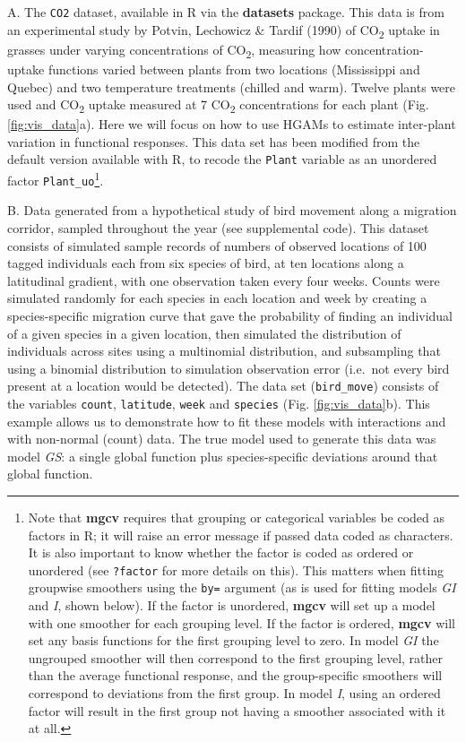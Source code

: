 \documentclass[12pt]{article}
\let\rmarkdownfootnote\footnote%
\def\footnote{\protect\rmarkdownfootnote}
\begin{document}
A. The \texttt{CO2} dataset, available in R via the \textbf{datasets}
package. This data is from an experimental study by Potvin, Lechowicz \&
Tardif (1990) of CO\textsubscript{2} uptake in grasses under varying
concentrations of CO\textsubscript{2}, measuring how
concentration-uptake functions varied between plants from two locations
(Mississippi and Quebec) and two temperature treatments (chilled and
warm). Twelve plants were used and CO\textsubscript{2} uptake measured
at 7 CO\textsubscript{2} concentrations for each plant (Fig.
\ref{fig:vis_data}a). Here we will focus on how to use HGAMs to estimate
inter-plant variation in functional responses. This data set has been
modified from the default version available with R, to recode the
\texttt{Plant} variable as an unordered factor
\texttt{Plant\_uo}\footnote{Note that \textbf{mgcv} requires that
  grouping or categorical variables be coded as factors in R; it will
  raise an error message if passed data coded as characters. It is also
  important to know whether the factor is coded as ordered or unordered
  (see \texttt{?factor} for more details on this). This matters when
  fitting groupwise smoothers using the \texttt{by=} argument (as is
  used for fitting models \emph{GI} and \emph{I}, shown below). If the
  factor is unordered, \textbf{mgcv} will set up a model with one
  smoother for each grouping level. If the factor is ordered,
  \textbf{mgcv} will set any basis functions for the first grouping
  level to zero. In model \emph{GI} the ungrouped smoother will then
  correspond to the first grouping level, rather than the average
  functional response, and the group-specific smoothers will correspond
  to deviations from the first group. In model \emph{I}, using an
  ordered factor will result in the first group not having a smoother
  associated with it at all.}.

B. Data generated from a hypothetical study of bird movement along a
migration corridor, sampled throughout the year (see supplemental code).
This dataset consists of simulated sample records of numbers of observed
locations of 100 tagged individuals each from six species of bird, at
ten locations along a latitudinal gradient, with one observation taken
every four weeks. Counts were simulated randomly for each species in
each location and week by creating a species-specific migration curve
that gave the probability of finding an individual of a given species in
a given location, then simulated the distribution of individuals across
sites using a multinomial distribution, and subsampling that using a
binomial distribution to simulation observation error (i.e.~not every
bird present at a location would be detected). The data set
(\texttt{bird\_move}) consists of the variables \texttt{count},
\texttt{latitude}, \texttt{week} and \texttt{species} (Fig.
\ref{fig:vis_data}b). This example allows us to demonstrate how to fit
these models with interactions and with non-normal (count) data. The
true model used to generate this data was model \emph{GS}: a single
global function plus species-specific deviations around that global
function.
\end{document}
